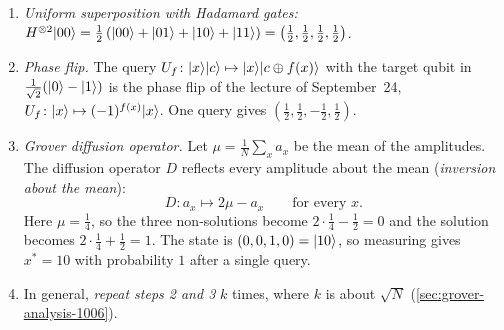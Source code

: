\begin{enumerate}
    \item \emph{Uniform superposition with Hadamard gates:}
          $H^{\otimes 2} \lvert 00 \rangle = \frac{1}{2}\left(\lvert 00 \rangle + \lvert 01 \rangle + \lvert 10 \rangle + \lvert 11 \rangle\right)
              = \left(\tfrac{1}{2}, \tfrac{1}{2}, \tfrac{1}{2}, \tfrac{1}{2}\right)$.
    \item \emph{Phase flip.} The query $U_f \colon \lvert x \rangle\lvert c \rangle \mapsto \lvert x \rangle\lvert c \oplus f(x) \rangle$
          with the target qubit in $\frac{1}{\sqrt{2}}(\lvert 0 \rangle - \lvert 1 \rangle)$ is the phase flip of the
          lecture of September~24, $U_f \colon \lvert x \rangle \mapsto (-1)^{f(x)} \lvert x \rangle$. One query gives
          $\left(\tfrac{1}{2}, \tfrac{1}{2}, -\tfrac{1}{2}, \tfrac{1}{2}\right)$.
    \item \emph{Grover diffusion operator.} Let $\mu = \frac{1}{N} \sum_{x} a_x$ be the mean of the
          amplitudes. The diffusion operator $D$ reflects every amplitude about the mean
          (\emph{inversion about the mean}):
          \[D \colon a_x \longmapsto 2\mu - a_x \qquad \text{for every } x.\]
          Here $\mu = \frac{1}{4}$, so the three non-solutions become $2 \cdot \frac{1}{4} - \frac{1}{2} = 0$
          and the solution becomes $2 \cdot \frac{1}{4} + \frac{1}{2} = 1$. The state is
          $(0, 0, 1, 0) = \lvert 10 \rangle$, so measuring gives $x^* = 10$ with probability $1$ after a
          single query.
    \item In general, \emph{repeat steps 2 and 3} $k$ times, where $k$ is about $\sqrt{N}$
          (\cref{sec:grover-analysis-1006}).
\end{enumerate}

